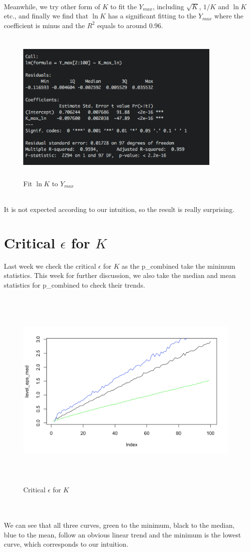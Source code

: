\documentclass[10pt,english]{article}\usepackage{graphicx, color}
\numberwithin{equation}{section}
\numberwithin{figure}{section}
\begin{document}
\quad\\
Meanwhile, we try other form of $K$ to fit the $Y_{max}$, including $\sqrt{K}$, $1/K$ and $\ln{K}$ etc., and finally we find that $\ln{K}$ has a significant fitting to the $Y_{max}$ where the coefficient is minus and the $R^2$ equals to around 0.96.\\
\begin{figure}[htbp]
\centering\includegraphics[width=4in, height=3in]{ln}
\caption{Fit $\ln{K}$ to $Y_{max}$}
\end{figure}
\quad\\
It is not expected according to our intuition, so the result is really surprising.

\section{Critical $\epsilon$ for $K$}
Last week we check the critical $\epsilon$ for $K$ as the p\_combined take the minimum statistics. This week for further discussion, we also take the median and mean statistics for p\_combined to check their trends.\\
\begin{figure}[htbp]
\centering\includegraphics[width=6in, height=4in]{cr}
\caption{Critical $\epsilon$ for $K$}
\end{figure}
\quad\\
\quad\\
We can see that all three curves, green to the minimum, black to the median, blue to the mean, follow an obvious linear trend and the minimum is the lowest curve, which corresponds to our intuition.
\end{document}
